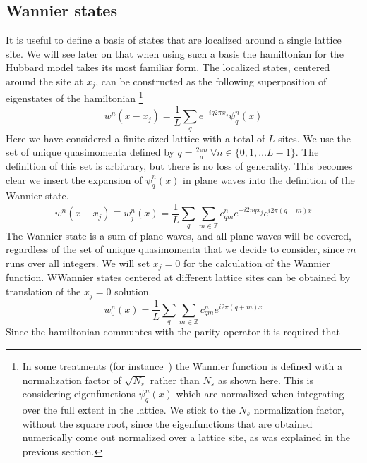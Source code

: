 \documentclass[oneside,11pt]{memoir}
\begin{document}
\subsection{Wannier states} 
\label{sec:1Dlattice}

It is useful to define a basis of states that are localized around a single
lattice site.  We will see later on that when using such a basis the
hamiltonian for the Hubbard model takes its most familiar form.    The
localized states, centered around the site at $x_{j}$, can be constructed as
the following superposition of eigenstates of the hamiltonian \footnote{In some
treatments (for instance~\cite{salomon2013many}) the Wannier function is
defined with a normalization factor of $\sqrt{N_{s}}$  rather than $N_{s}$ as
shown here.   This is considering eigenfunctions $\psi_{q}^{n}(x)$ which are
normalized when integrating over the full extent in the lattice.  We stick to
the $N_{s}$ normalization factor, without the square root, since the
eigenfunctions that are obtained numerically come out normalized over a lattice
site, as was explained in the previous section.} 
\begin{equation} w^{n}(x-x_{j}) =  \frac{1}{L} \sum_{q}  e^{-i q 2\pi x_{j} }
\psi_{q}^{n}(x) \label{eq:wannier} \end{equation} 
Here we have considered a
finite sized lattice with a total of $L$ sites.  We use the set of unique
quasimomenta defined by $q = \frac{2\pi n}{a} \  \forall n \in \lbrace
0,1,\ldots L-1\rbrace$.  The definition of this set is arbitrary, but there is
no loss of generality.   This becomes clear we insert the
expansion of $\psi_{q}^{n}(x)$ in plane waves into the definition of the
Wannier state. 
\begin{equation}
 w^{n}(x-x_{j}) \equiv w_{j}^{n}(x)= 
    \frac{1}{L} \sum_{q}  
   \sum_{m \in \mathbb{Z}} 
   c_{qm}^{n} 
   e^{-i 2\pi q x_{j} }  
   e^{i 2\pi(q+m)x} 
\end{equation}
The Wannier state is a sum of plane waves, and all plane waves will be covered,
regardless of the set of unique quasimomenta that we decide to consider, since
$m$ runs over all integers.  We will set $x_{j}=0$ for the calculation of the
Wannier function.  WWannier states centered at different lattice sites can be
obtained by translation of the $x_{j}=0$ solution. 
\begin{equation}
  w_{0}^{n}(x)= 
    \frac{1}{L} \sum_{q}  
   \sum_{m \in \mathbb{Z}} 
   c_{qm}^{n} 
   e^{i 2\pi(q+m)x} 
\end{equation}
Since the hamiltonian communtes with the parity operator it is required that
\end{document}
